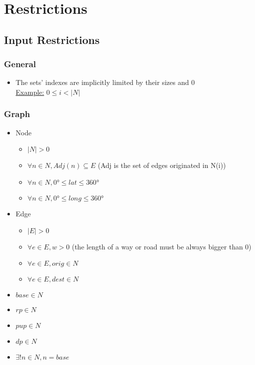\section{Restrictions}

\subsection{Input Restrictions}
\subsubsection{General}
\begin{itemize}
    \item The sets' indexes are implicitly limited by their sizes and 0\\ \uline{Example:}
    $ 0 \leq i < |N| $
\end{itemize}

\subsubsection{Graph}
\begin{itemize}
    \item Node
    \begin{itemize}
        \item $ |N| > 0 $ 
        \item $ \forall n \in N, Adj(n) \subseteq E $ (Adj is the set of edges originated in N(i))
        \item $ \forall n \in N, \ang{0} \leq lat \leq \ang{360} $
        \item $ \forall n \in N, \ang{0} \leq long \leq \ang{360} $
    \end{itemize}   
    
    \item{Edge}
    \begin{itemize}
        \item $ |E| > 0 $
        \item $ \forall e \in E, w > 0 $ (the length of a way or road must be always bigger than 0)
        \item $ \forall e \in E, orig \in N $ 
        \item $ \forall e \in E, dest \in N $
    \end{itemize}
    
    \item $ base \in N $
    \item $ rp \in N $
    \item $ pup \in N $
    \item $ dp \in N $
    \item $ \exists! n \in N, n = base $
    
\end{itemize}

